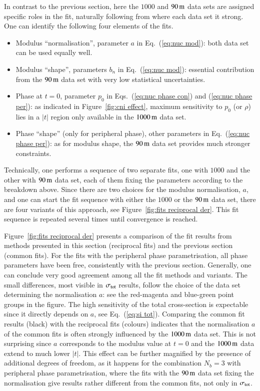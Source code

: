 In contrast to the previous section, here the $1000$ and $90\,{\rm m}$ data sets are assigned specific roles in the fit, naturally following from where each data set it strong. One can identify the following four elements of the fits.
\begin{itemize}
\item Modulus ``normalisation'', parameter $a$ in Eq.~(\ref{eq:nuc mod}): both data set can be used equally well.
\item Modulus ``shape'', parameters $b_n$ in Eq.~(\ref{eq:nuc mod}): essential contribution from the $90\,{\rm m}$ data set with very low statistical uncertainties.
\item Phase at $t = 0$, parameter $p_0$ in Eqs.~(\ref{eq:nuc phase con}) and (\ref{eq:nuc phase per}): as indicated in Figure~\ref{fig:cni effect}, maximum sensitivity to $p_0$ (or $\rho$) lies in a $|t|$ region only available in the $1000\,{\rm m}$ data set.
\item Phase ``shape'' (only for peripheral phase), other parameters in Eq.~(\ref{eq:nuc phase per}): as for modulus shape, the $90\,{\rm m}$ data set provides much stronger constraints.
\end{itemize}
Technically, one performs a sequence of two separate fits, one with $1000$ and the other with $90\,{\rm m}$ data set, each of them fixing the parameters according to the breakdown above. Since there are two choices for the modulus normalisation, $a$, and one can start the fit sequence with either the $1000$ or the $90\,{\rm m}$ data set, there are four variants of this approach, see Figure~\ref{fig:fits reciprocal der}. This fit sequence is repeated several times until convergence is reached.

Figure~\ref{fig:fits reciprocal der} presents a comparison of the fit results from methods presented in this section (reciprocal fits) and the previous section (common fits). For the fits with the peripheral phase parametrisation, all phase parameters have been free, consistently with the previous section. Generally, one can conclude very good agreement among all the fit methods and variants. The small differences, most visible in $\sigma_{\rm tot}$ results, follow the choice of the data set determining the normalisation $a$: see the red-magenta and blue-green point groups in the figure. The high sensitivity of the total cross-section is expectable since it directly depends on $a$, see Eq.~(\ref{eq:si tot}). Comparing the common fit results (black) with the reciprocal fits (colours) indicates that the normalisation $a$ of the common fits is often strongly influenced by the $1000\,{\rm m}$ data set. This is not surprising since $a$ corresponds to the modulus value at $t=0$ and the $1000\,{\rm m}$ data extend to much lower $|t|$. This effect can be further magnified by the presence of additional degrees of freedom, as it happens for the combination $N_b = 3$ with peripheral phase parametrisation, where the fits with the $90\,{\rm m}$ data set fixing the normalisation give results rather different from the common fits, not only in $\sigma_{\rm tot}$.

